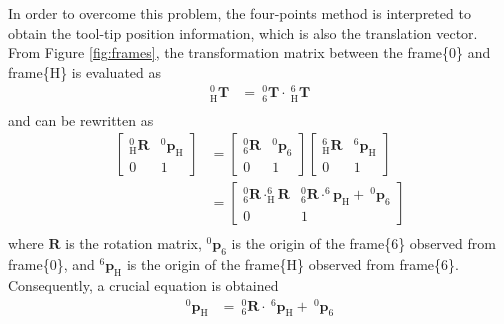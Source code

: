 \par
In order to overcome this problem, the four-points method is interpreted to obtain the tool-tip position information, which is also the translation vector. From Figure \ref{fig:frames}, the transformation matrix between the frame\{0\} and frame\{H\} is evaluated as 
\begin{equation}
\begin{split}
_{\mathrm{H}}^{\mathrm{0}}\mathbf{T} &=\ _{\mathrm{6}}^{\mathrm{0}}\mathbf{T}\cdot \ _{\mathrm{H}}^{\mathrm{6}}\mathbf{T}\\
\end{split}
\end{equation}		
and can be rewritten as
\begin{equation}
\begin{split}																												
\begin{bmatrix}
_{\mathrm{H}}^{\mathrm{0}}\mathbf{R} & ^\mathrm{0}\!\boldsymbol{p}_\mathrm{H}\\ 
0 & 1
\end{bmatrix} &=
\begin{bmatrix}
_{\mathrm{6}}^{\mathrm{0}}\mathbf{R} & ^\mathrm{0}\!\boldsymbol{p}_\mathrm{6}\\ 
0 & 1
\end{bmatrix}
\begin{bmatrix}
_{\mathrm{H}}^{\mathrm{6}}\mathbf{R} & ^\mathrm{6}\!\boldsymbol{p}_\mathrm{H}\\ 
0 & 1
\end{bmatrix}\\
&= 
\begin{bmatrix}
_{\mathrm{6}}^{\mathrm{0}}\mathbf{R} \cdot _{\mathrm{H}}^{\mathrm{6}}\!\mathbf{R} & _{\mathrm{6}}^{\mathrm{0}}\mathbf{R} \cdot ^\mathrm{6}\!\!\boldsymbol{p}_\mathrm{H} +\ ^\mathrm{0}\!\boldsymbol{p}_\mathrm{6}\\ 
0 & 1
\end{bmatrix}\\
\end{split}
\end{equation}
where $\mathbf{R}$ is the rotation matrix, $^0\boldsymbol{p}_\mathrm{6}$ is the origin of the frame\{6\} observed from frame\{0\}, and $^\mathrm{6}\!\boldsymbol{p}_\mathrm{H}$ is the origin of the frame\{H\} observed from frame\{6\}.
Consequently, a crucial equation is obtained
\begin{equation}
\begin{split}
^\mathrm{0}\!\boldsymbol{p}_\mathrm{H} &=\  _{\mathrm{6}}^{\mathrm{0}}\mathbf{R}\cdot\ ^\mathrm{6}\!\boldsymbol{p}_\mathrm{H} +\ ^\mathrm{0}\!\boldsymbol{p}_\mathrm{6}\\
\end{split}
\end{equation}
